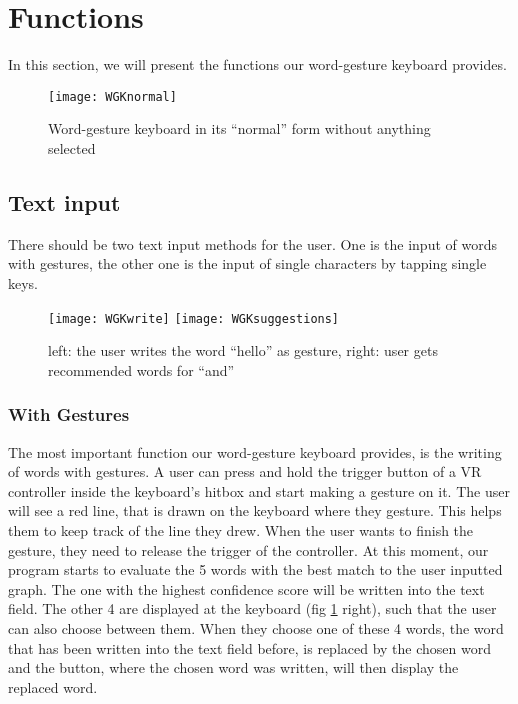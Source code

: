 \section{Functions}
In this section, we will present the functions our word-gesture keyboard provides.
\begin{figure}
\centering
\texttt{[image: WGKnormal]}
\caption{Word-gesture keyboard in its ``normal'' form without anything selected}
\end{figure}
    
\subsection{Text input}
There should be two text input methods for the user. One is the input of words with gestures, the other one is the input of single characters by tapping single keys.

\begin{figure}
\centering
\texttt{[image: WGKwrite]}
\texttt{[image: WGKsuggestions]}
\caption{left: the user writes the word ``hello'' as gesture, right: user gets recommended words for ``and''}
\label{fig:write_suggestions}
\end{figure}

\subsubsection{With Gestures}
The most important function our word-gesture keyboard provides, is the writing of words with gestures. A user can press and hold the trigger button of a VR controller inside the keyboard's hitbox and start making a gesture on it. The user will see a red line, that is drawn on the keyboard where they gesture. This helps them to keep track of the line they drew. When the user wants to finish the gesture, they need to release the trigger of the controller. At this moment, our program starts to evaluate the 5 words with the best match to the user inputted graph. The one with the highest confidence score will be written into the text field. The other 4 are displayed at the keyboard (fig \ref{fig:write_suggestions} right), such that the user can also choose between them. When they choose one of these 4 words, the word that has been written into the text field before, is replaced by the chosen word and the button, where the chosen word was written, will then display the replaced word.

